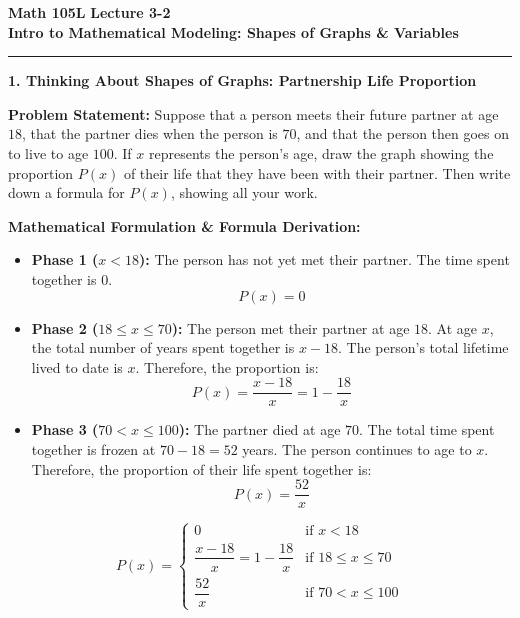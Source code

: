 \documentclass[10.5pt]{article}
\begin{document}
\noindent \textbf{\large Math 105L} \hfill \textbf{\large Lecture 3-2}\\[1pt]
{\textbf{\Large Intro to Mathematical Modeling: Shapes of Graphs \& Variables}}\\[-5pt]
\rule{\textwidth}{1.2pt}

\vspace{0.03in}

\textbf{\large 1. Thinking About Shapes of Graphs: Partnership Life Proportion}

\begin{tcolorbox}[colback=boxbg, colframe=boxframe, boxrule=0.8pt, arc=3pt, left=8pt, right=8pt, top=4pt, bottom=4pt]
\textbf{Problem Statement:} Suppose that a person meets their future partner at age $18$, that the partner dies when the person is $70$, and that the person then goes on to live to age $100$. If $x$ represents the person's age, draw the graph showing the proportion $P(x)$ of their life that they have been with their partner. Then write down a formula for $P(x)$, showing all your work.
\end{tcolorbox}

\vspace{0.04in}

\textbf{Mathematical Formulation \& Formula Derivation:}
\begin{itemize}[leftmargin=1.2em, topsep=1pt, itemsep=2pt]
  \item \textbf{Phase 1 ($x < 18$):} The person has not yet met their partner. The time spent together is $0$.
  \[
  P(x) = 0
  \]
  \item \textbf{Phase 2 ($18 \le x \le 70$):} The person met their partner at age $18$. At age $x$, the total number of years spent together is $x - 18$. The person's total lifetime lived to date is $x$. Therefore, the proportion is:
  \[
  P(x) = \frac{x - 18}{x} = 1 - \frac{18}{x}
  \]
  \item \textbf{Phase 3 ($70 < x \le 100$):} The partner died at age $70$. The total time spent together is frozen at $70 - 18 = 52$ years. The person continues to age to $x$. Therefore, the proportion of their life spent together is:
  \[
  P(x) = \frac{52}{x}
  \]
\end{itemize}

\begin{tcolorbox}[colback=white, colframe=chalkblue, boxrule=1pt, arc=3pt, left=10pt, right=10pt, top=4pt, bottom=4pt]
\[
P(x) = \begin{cases}
0 & \text{if } x < 18 \\[4pt]
\dfrac{x - 18}{x} = 1 - \dfrac{18}{x} & \text{if } 18 \le x \le 70 \\[6pt]
\dfrac{52}{x} & \text{if } 70 < x \le 100
\end{cases}
\]
\end{tcolorbox}
\end{document}
